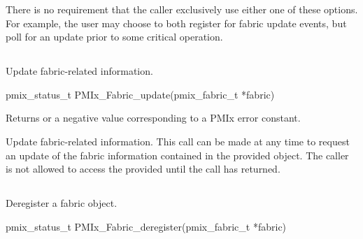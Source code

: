 There is no requirement that the caller exclusively use either one of these options. For example, the user may choose to both register for fabric update events, but poll for an update prior to some critical operation.

\subsection{}

\summary

Update fabric-related information.

\format

\cspecificstart
\begin{codepar}
pmix_status_t
PMIx_Fabric_update(pmix_fabric_t *fabric)
\end{codepar}
\cspecificend

\begin{arglist}
\end{arglist}

Returns  or a negative value corresponding to a \ac{PMIx} error constant.

\descr

Update fabric-related information. This call can be made at any time to request an update of the fabric information contained in the provided  object. The caller is not allowed to access the provided  until the call has returned.


\subsection{}

\summary

Deregister a fabric object.

\format

\cspecificstart
\begin{codepar}
pmix_status_t PMIx_Fabric_deregister(pmix_fabric_t *fabric)
\end{codepar}
\cspecificend

\begin{arglist}
\end{arglist}

